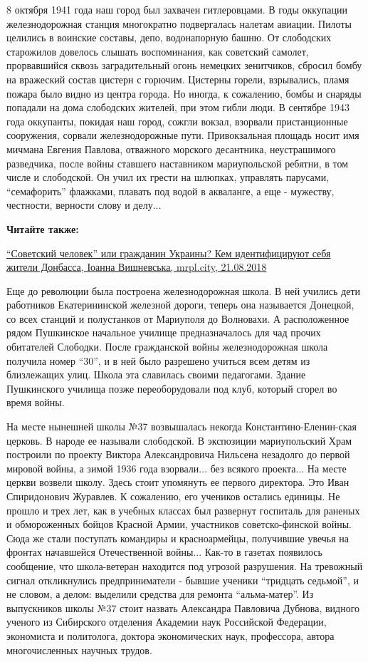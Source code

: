8 октября 1941 года наш город был захвачен гитлеровцами. В годы оккупации
железнодорожная станция многократно подвергалась налетам авиации. Пилоты
целились в воинские составы, депо, водонапорную башню. От слободских старожилов
довелось слышать воспоминания, как советский самолет, прорвавшийся сквозь
заградительный огонь немецких зенитчиков, сбросил бомбу на вражеский состав
цистерн с горючим. Цистерны горели, взрывались, пламя пожара было видно из
центра города. Но иногда, к сожалению, бомбы и снаряды попадали на дома
слободских жителей, при этом гибли люди. В сентябре 1943 года оккупанты,
покидая наш город, сожгли вокзал, взорвали пристанционные сооружения, сорвали
железнодорожные пути. Привокзальная площадь носит имя мичмана Евгения Павлова,
отважного морского десантника, неустрашимого разведчика, после войны ставшего
наставником мариупольской ребятни, в том числе и слободской. Он учил их грести
на шлюпках, управлять парусами, \enquote{семафорить} флажками, плавать под водой в
акваланге, а еще - мужеству, честности, верности слову и делу...

\textbf{Читайте также:} 

\href{https://mrpl.city/news/view/sovetskij-chelovek-ili-grazhdanin-ukrainy-kem-identifitsiruyut-sebya-zhiteli-donbassa}{%
\enquote{Советский человек} или гражданин Украины? Кем идентифицируют себя жители Донбасса, Іоанна Вишневська, mrpl.city, 21.08.2018}

Еще до революции была построена железнодорожная школа. В ней учились дети
работников Екатерининской железной дороги, теперь она называется Донецкой, со
всех станций и полустанков от Мариуполя до Волновахи. А расположенное рядом
Пушкинское начальное училище предназначалось для чад прочих обитателей
Слободки. После гражданской войны железнодорожная школа получила номер \enquote{30}, и
в ней было разрешено учиться всем детям из близлежащих улиц. Школа эта
славилась своими педагогами. Здание Пушкинского училища позже переоборудовали
под клуб, который сгорел во время войны.

На месте нынешней школы №37 возвышалась некогда Константино-Еленин\hyp{}ская церковь.
В народе ее называли слободской. В экспозиции мариупольский Храм построили по
проекту Виктора Александровича Нильсена незадолго до первой мировой войны, а
зимой 1936 года взорвали... без всякого проекта... На месте церкви  возвели школу.
Здесь стоит упомянуть ее первого директора. Это Иван Спиридонович Журавлев. К
сожалению, его учеников остались единицы. Не прошло и трех лет, как в учебных
классах был развернут госпиталь для раненых и обмороженных бойцов Красной
Армии, участников советско-финской войны. Сюда же стали поступать командиры и
красноармейцы, получившие увечья на фронтах начавшейся Отечественной войны...
Как-то в газетах появилось сообщение, что школа-ветеран находится под угрозой
разрушения. На тревожный сигнал откликнулись предприниматели - бывшие ученики
\enquote{тридцать седьмой}, и не словом, а делом: выделили средства для ремонта
\enquote{альма-матер}. Из выпускников школы №37 стоит назвать Александра Павловича
Дубнова, видного ученого из Сибирского отделения Академии наук Российской
Федерации, экономиста и политолога, доктора экономических наук, профессора,
автора многочисленных научных трудов.

